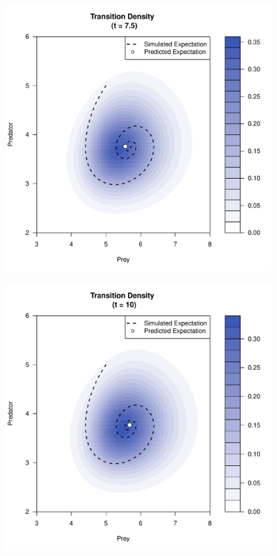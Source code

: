 \documentclass[a4paper,11pt]{article}\usepackage[]{graphicx}\usepackage[]{color}
\newenvironment{knitrout}{}{} %
\begin{document}
\begin{knitrout}
\includegraphics[width=4in,height=4in]{figure/GQD-coupledPlot-3} 

\includegraphics[width=4in,height=4in]{figure/GQD-coupledPlot-4} 

\end{knitrout}
\end{document}
